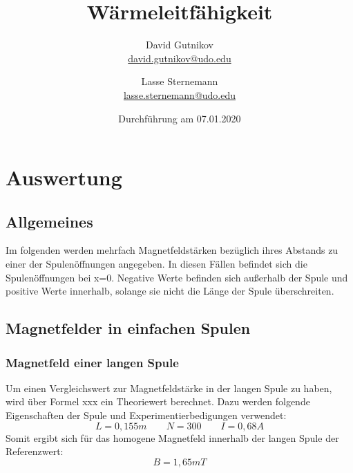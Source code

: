 \documentclass[titlepage = firstcover]{scrartcl}
\title{Wärmeleitfähigkeit}
\author{
  David Gutnikov\\
  \href{mailto:david.gutnikov@udo.edu}{david.gutnikov@udo.edu}
 \and 
  Lasse Sternemann\\
  \href{mailto:lasse.sternemann@udo.edu}{lasse.sternemann@udo.edu}
}
\date{Durchführung am 07.01.2020}
\begin{document}
  \maketitle
  \newpage
  \tableofcontents
  \newpage


\section{Auswertung}
    \subsection{Allgemeines}
        Im folgenden werden mehrfach Magnetfeldstärken bezüglich ihres Abstands zu einer der Spulenöffnungen angegeben. In diesen Fällen befindet sich die 
        Spulenöffnungen bei x=0. Negative Werte befinden sich außerhalb der Spule und positive Werte innerhalb, solange sie nicht die Länge der Spule 
        überschreiten.
    \subsection{Magnetfelder in einfachen Spulen}
        \subsubsection{Magnetfeld einer langen Spule}
            Um einen Vergleichswert zur Magnetfeldstärke in der langen Spule zu haben, wird über Formel xxx ein Theoriewert berechnet. Dazu werden folgende 
            Eigenschaften der Spule und Experimentierbedigungen verwendet:
            \begin{equation*}  
                L = 0,155m \qquad N = 300 \qquad I = 0,68 A 
            \end{equation*}    
            Somit ergibt sich für das homogene Magnetfeld innerhalb der langen Spule der Referenzwert:
            \begin{equation}
                B = 1,65 mT 
                \label{eqn:BLang}
            \end{equation}
\end{document}
